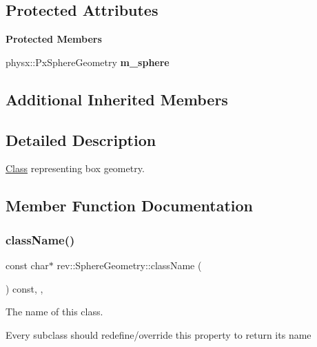 \subsection*{Protected Attributes}
\begin{Indent}\textbf{ Protected Members}\par
\begin{DoxyCompactItemize}
\item 
\mbox{\label{classrev_1_1_sphere_geometry_a559a77df632268072f7af7206f51f65c}} 
physx\+::\+Px\+Sphere\+Geometry {\bfseries m\+\_\+sphere}
\end{DoxyCompactItemize}
\end{Indent}
\subsection*{Additional Inherited Members}


\subsection{Detailed Description}
\mbox{\hyperlink{struct_class}{Class}} representing box geometry. 

\subsection{Member Function Documentation}
\mbox{\label{classrev_1_1_sphere_geometry_ac7447dddbb37769070e302792ced7ac2}} 
\subsubsection{\texorpdfstring{className()}{className()}}
{\footnotesize\ttfamily const char$\ast$ rev\+::\+Sphere\+Geometry\+::class\+Name (\begin{DoxyParamCaption}{ }\end{DoxyParamCaption}) const\hspace{0.3cm}{\ttfamily [inline]}, {\ttfamily [override]}, {\ttfamily [virtual]}}



The name of this class. 

Every subclass should redefine/override this property to return its name 

